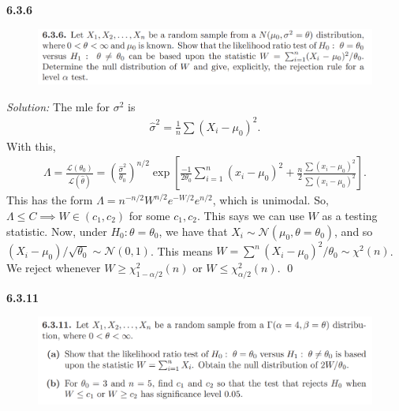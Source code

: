 \documentclass{book}
\theoremstyle{definition}
\newcommand{\lag}{\mathcal{L}}
\newcommand{\al}{\alpha}
\newcommand{\N}{\mathcal{N}}
\newcommand{\f}[2]{\frac{#1}{#2}}
\newcommand{\lp}{\left(}
\newcommand{\rp}{\right)}
\newcommand{\lb}{\left[}
\newcommand{\rb}{\right]}
\begin{document}
\newpage



\noindent \textbf{6.3.6}
\begin{figure}[!htb]
	\centering
	\includegraphics[scale=0.6]{636}
\end{figure}


\noindent \textit{Solution:} 
The mle for $\sigma^2$ is 
\begin{align}
\hat\sigma^2 = \f{1}{n}\sum (X_i  -\mu_0)^2.
\end{align}
With this, 
\begin{align}
\Lambda = \f{\lag(\theta_0)}{\lag(\hat\theta)} = \lp \f{\hat\sigma^2}{\theta_0}\rp^{n/2} \exp\lb \f{-1}{2\theta_0}\sum^n_{i=1}(x_i - \mu_0)^2 + \f{n}{2}\f{\sum(x_i - \mu_0)^2}{\sum(x_i - \mu_0)^2} \rb.
\end{align}
This has the form $\Lambda = n^{-n/2} W^{n/2} e^{-W/2} e^{n/2}$, which is unimodal. So, $\Lambda \leq C \implies W \in (c_1, c_2)$ for some $c_1, c_2$. This says we can use $W$ as a testing statistic. Now, under $H_0: \theta = \theta_0$, we have that $X_i \sim \N(\mu_0, \theta=\theta_0)$, and so $(X_i - \mu_0)/\sqrt{\theta_0} \sim \N(0,1) $. This means $W = \sum^n (X_i - \mu_0)^2/\theta_0 \sim \chi^2(n)$. \\

We reject whenever $W \geq \chi^2_{1-\al/2}(n)$ or $W \leq \chi^2_{\al/2}(n)$. \qed











\newpage
\noindent \textbf{6.3.11}
\begin{figure}[!htb]
	\centering
	\includegraphics[scale=0.6]{6311}
\end{figure}
\end{document}
